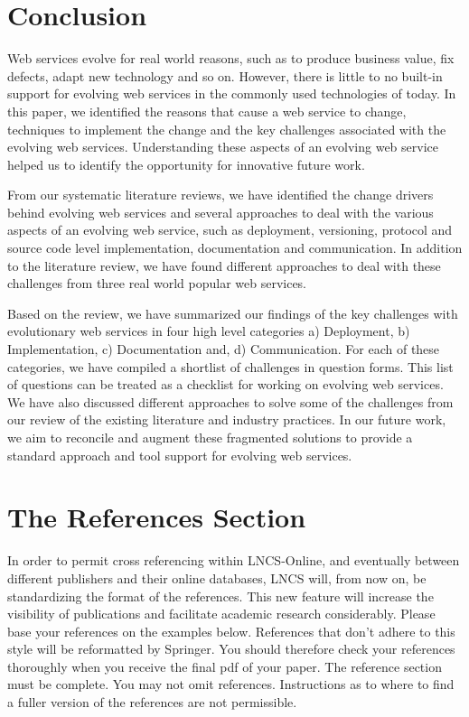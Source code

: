 \documentclass[runningheads,a4paper]{llncs}
\begin{document}
\section{Conclusion} %
\label{sec:conclusion}
Web services evolve for real world reasons, such as to produce business value, fix defects, adapt new technology and so on. However, there is little to no built-in support for evolving web services in the commonly used technologies of today. In this paper, we identified the reasons that cause a web service to change, techniques to implement the change and the key challenges associated with the evolving web services. Understanding these aspects of an evolving web service helped us to identify the opportunity for innovative future work.

From our systematic literature reviews, we have identified the change drivers behind evolving web services and several approaches to deal with the various aspects of an evolving web service, such as deployment, versioning, protocol and source code level implementation, documentation and communication. In addition to the literature review, we have found different approaches to deal with these challenges from three real world popular web services.

Based on the review, we have summarized our findings of the key challenges with evolutionary web services in four high level categories a) Deployment, b) Implementation, c) Documentation and, d) Communication. For each of these categories, we have compiled a shortlist of challenges in question forms. This list of questions can be treated as a checklist for working on evolving web services. We have also discussed different approaches to solve some of the challenges from our review of the existing literature and industry practices. In our future work, we aim to reconcile and augment these fragmented solutions to provide a standard approach and tool support for evolving web services.

\section{The References Section}\label{references}

In order to permit cross referencing within LNCS-Online, and eventually
between different publishers and their online databases, LNCS will,
from now on, be standardizing the format of the references. This new
feature will increase the visibility of publications and facilitate
academic research considerably. Please base your references on the
examples below. References that don't adhere to this style will be
reformatted by Springer. You should therefore check your references
thoroughly when you receive the final pdf of your paper.
The reference section must be complete. You may not omit references.
Instructions as to where to find a fuller version of the references are
not permissible.
\end{document}
